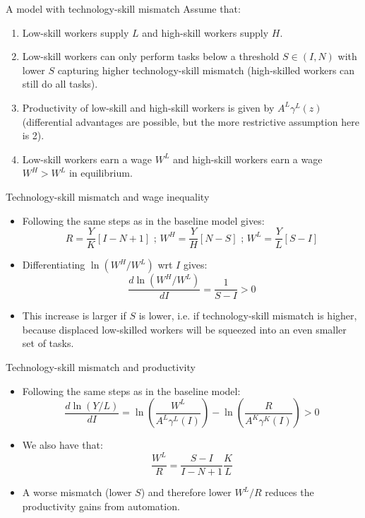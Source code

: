 \documentclass[notes=show]{beamer}
\begin{document}
\begin{frame}{A model with technology-skill mismatch}
Assume that:
\begin{enumerate}
\item Low-skill workers supply $L$ and high-skill workers supply $H$. \medskip
\item Low-skill workers can only perform tasks below a threshold $S \in (I,N)$ with lower $S$ capturing higher technology-skill mismatch (high-skilled workers can still do all tasks). \medskip
\item Productivity of low-skill and high-skill workers is given by $A^{L} \gamma^{L}(z)$ (differential advantages are possible, but the more restrictive assumption here is 2). \medskip
\item Low-skill workers earn a wage $W^{L}$ and high-skill workers earn a wage $W^{H}>W^{L}$ in equilibrium.
\end{enumerate}
\end{frame}

\begin{frame}{Technology-skill mismatch and wage inequality}
\begin{itemize}
\item Following the same steps as in the baseline model gives:
\[
R=\frac{Y}{K}[I-N+1] \text{ ; } W^{H}=\frac{Y}{H}[N-S] \text{ ; } W^{L}=\frac{Y}{L}[S-I]
\]
\item Differentiating $\ln(W^{H}/W^{L})$ wrt $I$ gives:
\[
\frac{d\ln(W^{H}/W^{L})}{dI} = \frac{1}{S-I} > 0
\]
\item This increase is larger if $S$ is lower, i.e. if technology-skill mismatch is higher, because displaced low-skilled workers will be squeezed into an even smaller set of tasks.
\end{itemize}
\end{frame}

\begin{frame}{Technology-skill mismatch and productivity}
\begin{itemize}
\item Following the same steps as in the baseline model:
\[
\frac{d\ln(Y/L)}{dI} = \ln \left(\frac{W^{L}}{A^{L}\gamma^{L}(I)} \right) - \ln \left(\frac{R}{A^{K}\gamma^{K}(I)} \right) > 0
\]
\item We also have that:
\[
\frac{W^{L}}{R} = \frac{S-I}{I-N+1} \frac{K}{L}
\]
\item A worse mismatch (lower $S$) and therefore lower $W^{L}/R$ reduces the productivity gains from automation.
\end{itemize}
\end{frame}
\end{document}
